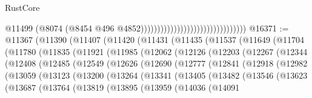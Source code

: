 \begin{lexlean}{RustCore}
\begin{coremodule}
                                                                @11499
                                                                (@8074
                                                                  (@8454
                                                                    @496
                                                                    @4852))))))))))))))))))))))))))))))))
@16371 := @11367
    (@11390
      (@11407
        (@11420
          (@11431
            (@11435
              (@11537
                (@11649
                  (@11704
                    (@11780
                      (@11835
                        (@11921
                          (@11985
                            (@12062
                              (@12126
                                (@12203
                                  (@12267
                                    (@12344
                                      (@12408
                                        (@12485
                                          (@12549
                                            (@12626
                                              (@12690
                                                (@12777
                                                  (@12841
                                                    (@12918
                                                      (@12982
                                                        (@13059
                                                          (@13123
                                                            (@13200
                                                              (@13264
                                                                (@13341
                                                                  (@13405
                                                                    (@13482
                                                                      (@13546
                                                                        (@13623
                                                                          (@13687
                                                                            (@13764
                                                                              (@13819
                                                                                (@13895
                                                                                  (@13959
                                                                                    (@14036
                                                                                      (@14091

\end{coremodule}
\end{lexlean}
